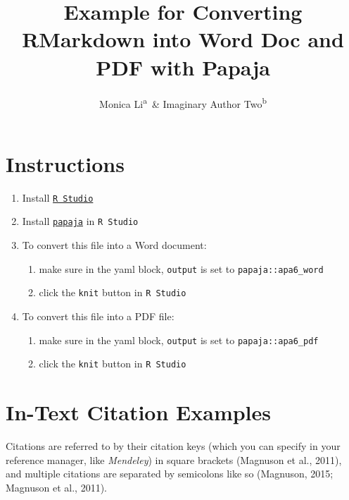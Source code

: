 \documentclass[english,floatsintext,man]{apa6}
\title{Example for Converting RMarkdown into Word Doc and PDF with Papaja}
\author{Monica Li\textsuperscript{a}~\& Imaginary Author Two\textsuperscript{b}}
\affiliation{
    \vspace{0.5cm}
          \textsuperscript{a} University of Connecticut\\
          \textsuperscript{b} Institute of Somewhere Over the Rainbow  }
\providecommand{\tightlist}{%
  \setlength{\itemsep}{0pt}\setlength{\parskip}{0pt}}
\theoremstyle{definition}
\theoremstyle{definition}
\theoremstyle{remark}
\begin{document}
\maketitle

\setcounter{secnumdepth}{0}



\section{Instructions}\label{instructions}

\begin{enumerate}
\def\labelenumi{\arabic{enumi}.}
\item
  Install
  \href{https://www.rstudio.com/products/rstudio/download/}{\texttt{R\ Studio}}
\item
  Install \href{https://github.com/crsh/papaja}{\texttt{papaja}} in
  \texttt{R\ Studio}
\item
  To convert this file into a Word document:

  \begin{enumerate}
  \def\labelenumii{\arabic{enumii}.}
  \tightlist
  \item
    make sure in the yaml block, \texttt{output} is set to
    \texttt{papaja::apa6\_word}
  \item
    click the \texttt{knit} button in \texttt{R\ Studio}
  \end{enumerate}
\item
  To convert this file into a PDF file:

  \begin{enumerate}
  \def\labelenumii{\arabic{enumii}.}
  \tightlist
  \item
    make sure in the yaml block, \texttt{output} is set to
    \texttt{papaja::apa6\_pdf}
  \item
    click the \texttt{knit} button in \texttt{R\ Studio}
  \end{enumerate}
\end{enumerate}

\section{In-Text Citation Examples}\label{in-text-citation-examples}

Citations are referred to by their citation keys (which you can specify
in your reference manager, like \emph{Mendeley}) in square brackets
(Magnuson et al., 2011), and multiple citations are separated by
semicolons like so (Magnuson, 2015; Magnuson et al., 2011).
\end{document}
